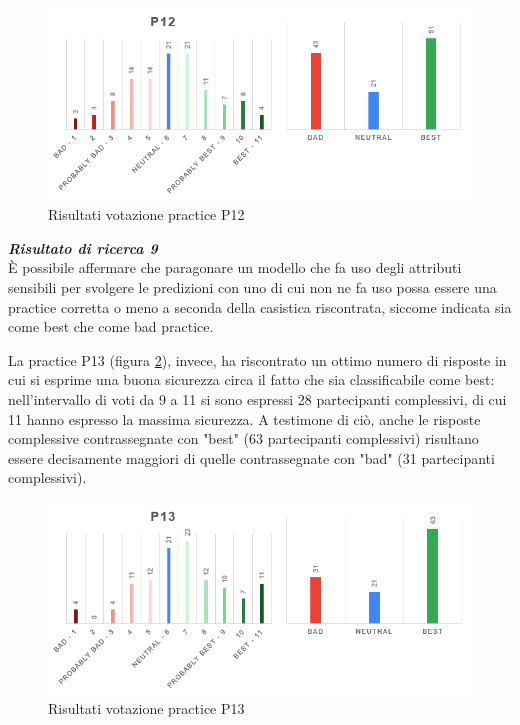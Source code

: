 \begin{figure}[h!]
    \centering
    \includegraphics[width=1\textwidth]{figure/data-analysis3/P12.png}
    \caption{Risultati votazione practice P12}
    \label{im-a-prac-13}
\end{figure}

\begin{center}
    \begin{tcolorbox}[width=400pt, colframe=black, colback=Gray!30]
		\begin{minipage}{\textwidth}
			\textit{\faKey \textbf{ Risultato di ricerca 9}}\\
			È possibile affermare che paragonare un modello che fa uso degli attributi sensibili per svolgere le predizioni con uno di cui non ne fa uso possa essere una practice corretta o meno a seconda della casistica riscontrata, siccome indicata sia come best che come bad practice.
		\end{minipage}
	\end{tcolorbox}
\end{center}

La practice P13 (figura \ref{im-a-prac-14}), invece, ha riscontrato un ottimo numero di risposte in cui si esprime una buona sicurezza circa il fatto che sia classificabile come best: nell'intervallo di voti da 9 a 11 si sono espressi 28 partecipanti complessivi, di cui 11 hanno espresso la massima sicurezza. A testimone di ciò, anche le risposte complessive contrassegnate con "best" (63 partecipanti complessivi) risultano essere decisamente maggiori di quelle contrassegnate con "bad" (31 partecipanti complessivi).

\begin{figure}[h!]
    \centering
    \includegraphics[width=1\textwidth]{figure/data-analysis3/P13.png}
    \caption{Risultati votazione practice P13}
    \label{im-a-prac-14}
\end{figure}


